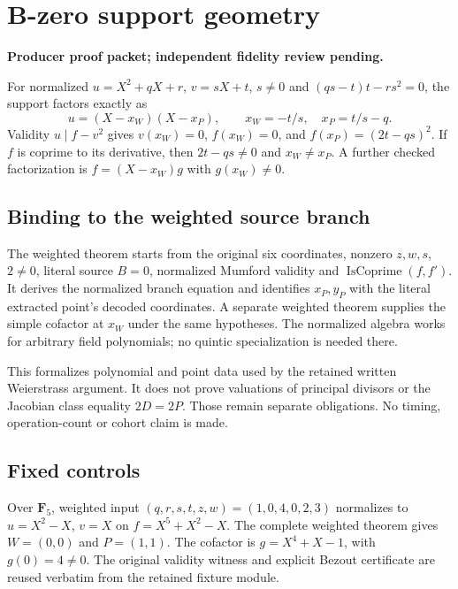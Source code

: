 \documentclass[10pt]{article}
\begin{document}
\section*{B-zero support geometry}
\textbf{Producer proof packet; independent fidelity review pending.}

For normalized $u=X^2+qX+r$, $v=sX+t$, $s\ne0$ and $(qs-t)t-rs^2=0$, the support factors exactly as
\[
 u=(X-x_W)(X-x_P),\qquad x_W=-t/s,\quad x_P=t/s-q.
\]
Validity $u\mid f-v^2$ gives $v(x_W)=0$, $f(x_W)=0$, and
$f(x_P)=(2t-qs)^2$. If $f$ is coprime to its derivative, then $2t-qs\ne0$ and $x_W\ne x_P$. A further checked factorization is $f=(X-x_W)g$ with $g(x_W)\ne0$.

\begin{center}\end{center}
\subsection*{Binding to the weighted source branch}
The weighted theorem starts from the original six coordinates, nonzero $z,w,s$, $2\ne0$, literal source $B=0$, normalized Mumford validity and $\operatorname{IsCoprime}(f,f')$. It derives the normalized branch equation and identifies $x_P,y_P$ with the literal extracted point's decoded coordinates. A separate weighted theorem supplies the simple cofactor at $x_W$ under the same hypotheses. The normalized algebra works for arbitrary field polynomials; no quintic specialization is needed there.

This formalizes polynomial and point data used by the retained written Weierstrass argument. It does not prove valuations of principal divisors or the Jacobian class equality $2D=2P$. Those remain separate obligations. No timing, operation-count or cohort claim is made.
\subsection*{Fixed controls}
Over $\mathbf F_5$, weighted input $(q,r,s,t,z,w)=(1,0,4,0,2,3)$ normalizes to $u=X^2-X$, $v=X$ on $f=X^5+X^2-X$. The complete weighted theorem gives $W=(0,0)$ and $P=(1,1)$. The cofactor is $g=X^4+X-1$, with $g(0)=4\ne0$. The original validity witness and explicit Bezout certificate are reused verbatim from the retained fixture module.
\end{document}
